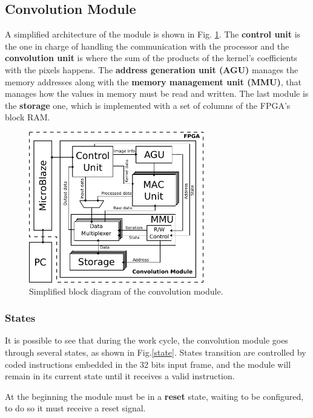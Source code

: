 \documentclass[conference,compsoc]{IEEEtran}
\begin{document}

\subsection{Convolution Module}
A simplified architecture of the module is shown in Fig. \ref{general}.
The \textbf{control unit} is the one in charge of handling the communication
with the processor and the \textbf{convolution unit} is where the sum of
the products of the kernel's coefficients with the pixels happens. The
\textbf{address generation unit (AGU)} manages the memory addresses along with the
\textbf{memory management unit (MMU)}, that manages how the values in memory must be
read and written. The last module is the \textbf{storage} one, which is implemented with a
set of columns of the FPGA's block RAM.

\begin{figure}[!t]
\centering
\includegraphics[width=3in]{general.pdf}
\caption{Simplified block diagram of the convolution module.}
\label{general}
\end{figure}

\subsubsection{States}
It is possible to see that during the work cycle, the convolution module goes
through several states, as shown in Fig.\ref{state}.
States transition are controlled by coded instructions embedded in the 32 bits input frame,
and the module will remain in its current state until it receives a valid instruction.

At the beginning the module must be in a \textbf{reset} state, waiting to be
configured, to do so it must receive a reset signal.
\end{document}
